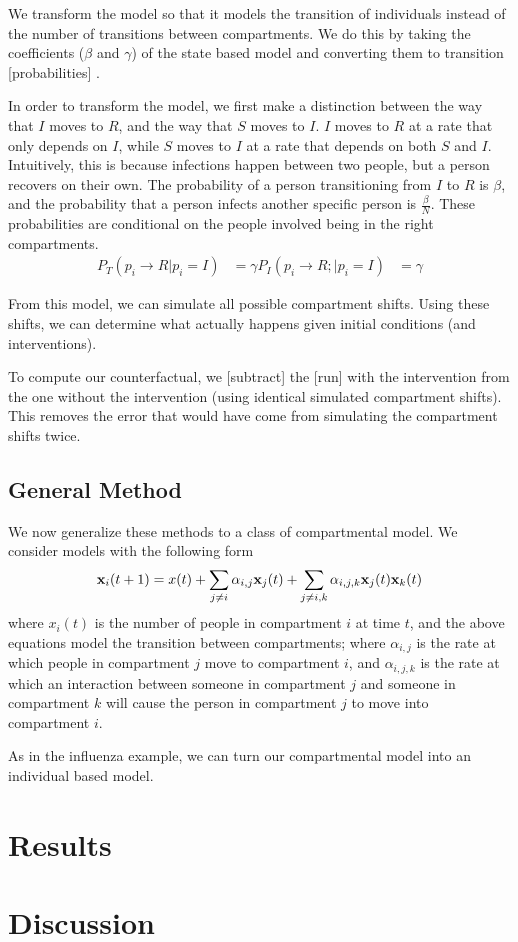 \documentclass{article}
\renewcommand{\vec}[1]{{\textbf #1}}
\begin{document}
We transform the model so that it models the transition of individuals instead of the number of transitions between compartments.  We do this by taking the coefficients ($\beta$ and $\gamma$) of the state based model and converting them to transition [probabilities] %
.

In order to transform the model, we first make a distinction between the way that $I$ moves to $R$, and the way that $S$ moves to $I$.  $I$ moves to $R$ at a rate that only depends on $I$, while $S$ moves to $I$ at a rate that depends on both $S$ and $I$.  Intuitively, this is because infections happen between two people, but a person recovers on their own.  The probability of a person transitioning from $I$ to $R$ is $\beta$, and the probability that a person infects another specific person is $\frac{\beta}{N}$.  These probabilities are conditional on the people involved being in the right compartments.
\begin{align*}
P_T(p_i \rightarrow R \vert p_i = I) &= \gamma
P_I(p_i \rightarrow R;  \vert p_i = I) &= \gamma
\end{align*}

From this model, we can simulate all possible compartment shifts. %
Using these shifts, we can determine what actually happens given initial conditions (and interventions).

To compute our counterfactual, we [subtract] the [run] with the intervention from the one without the intervention (using identical simulated compartment shifts).  This removes the error that would have come from simulating the compartment shifts twice.

\subsection*{General Method}

We now generalize these methods to a class of compartmental model.  We consider models with the following form
\begin{align*}
\vec{x}_i(t+1) = x(t) + \sum_{j \neq i} \alpha_{i,j} \vec{x}_j(t) +  \sum_{j \neq i,k} \alpha_{i,j,k} \vec{x}_j(t) \vec x_k(t)
\end{align*}
where $x_i(t)$ is the number of people in compartment $i$ at time $t$, and the above equations model the transition between compartments; where $\alpha_{i,j}$ is the rate at which people in compartment $j$ move to compartment $i$, and $\alpha_{i,j,k}$ is the rate at which an interaction between someone in compartment $j$ and someone in compartment $k$ will cause the person in compartment $j$ to move into compartment $i$.

As in the influenza example, we can turn our compartmental model into an individual based model.

\section{Results}
\section{Discussion}

{}

\end{document}
